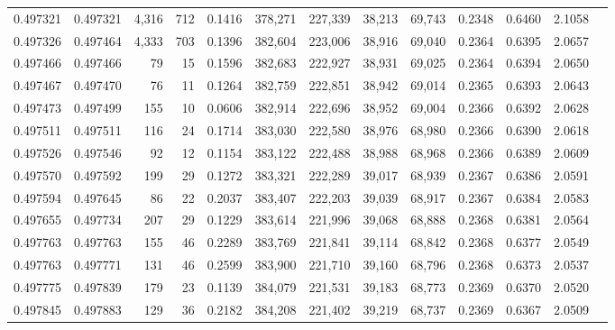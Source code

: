 \begin{tabular}{rrrrrrrrrrrrr}
0.497321 & 0.497321 & 4,316 &   712 &                                     0.1416 & 378,271 & 227,339 &  38,213 &  69,743 & 0.2348 & 0.6460 & 2.1058 \\
0.497326 & 0.497464 & 4,333 &   703 &                                     0.1396 & 382,604 & 223,006 &  38,916 &  69,040 & 0.2364 & 0.6395 & 2.0657 \\
0.497466 & 0.497466 &    79 &    15 &                                     0.1596 & 382,683 & 222,927 &  38,931 &  69,025 & 0.2364 & 0.6394 & 2.0650 \\
0.497467 & 0.497470 &    76 &    11 &                                     0.1264 & 382,759 & 222,851 &  38,942 &  69,014 & 0.2365 & 0.6393 & 2.0643 \\
0.497473 & 0.497499 &   155 &    10 &                                     0.0606 & 382,914 & 222,696 &  38,952 &  69,004 & 0.2366 & 0.6392 & 2.0628 \\
0.497511 & 0.497511 &   116 &    24 &                                     0.1714 & 383,030 & 222,580 &  38,976 &  68,980 & 0.2366 & 0.6390 & 2.0618 \\
0.497526 & 0.497546 &    92 &    12 &                                     0.1154 & 383,122 & 222,488 &  38,988 &  68,968 & 0.2366 & 0.6389 & 2.0609 \\
0.497570 & 0.497592 &   199 &    29 &                                     0.1272 & 383,321 & 222,289 &  39,017 &  68,939 & 0.2367 & 0.6386 & 2.0591 \\
0.497594 & 0.497645 &    86 &    22 &                                     0.2037 & 383,407 & 222,203 &  39,039 &  68,917 & 0.2367 & 0.6384 & 2.0583 \\
0.497655 & 0.497734 &   207 &    29 &                                     0.1229 & 383,614 & 221,996 &  39,068 &  68,888 & 0.2368 & 0.6381 & 2.0564 \\
0.497763 & 0.497763 &   155 &    46 &                                     0.2289 & 383,769 & 221,841 &  39,114 &  68,842 & 0.2368 & 0.6377 & 2.0549 \\
0.497763 & 0.497771 &   131 &    46 &                                     0.2599 & 383,900 & 221,710 &  39,160 &  68,796 & 0.2368 & 0.6373 & 2.0537 \\
0.497775 & 0.497839 &   179 &    23 &                                     0.1139 & 384,079 & 221,531 &  39,183 &  68,773 & 0.2369 & 0.6370 & 2.0520 \\
0.497845 & 0.497883 &   129 &    36 &                                     0.2182 & 384,208 & 221,402 &  39,219 &  68,737 & 0.2369 & 0.6367 & 2.0509 \\

\end{tabular}
